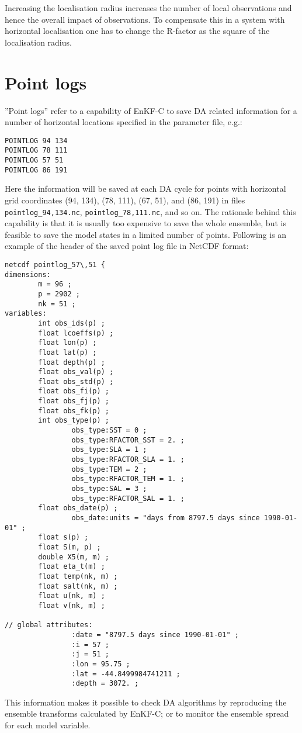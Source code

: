 \documentclass[11pt]{report}
\begin{document}
Increasing the localisation radius increases the number of local observations and hence the overall impact of observations.
To compensate this in a system with horizontal localisation one has to change the R-factor as the square of the localisation radius.

\section{Point logs}

''Point logs'' refer to a capability of EnKF-C to save DA related information for a number of horizontal locations specified in the parameter file, e.g.:
\begin{Verbatim}[frame=single,fontsize=\footnotesize]
POINTLOG 94 134
POINTLOG 78 111
POINTLOG 57 51
POINTLOG 86 191
\end{Verbatim}
Here the information will be saved at each DA cycle for points with horizontal grid coordinates (94, 134), (78, 111), (67, 51), and (86, 191) in files \verb|pointlog_94,134.nc|, \verb|pointlog_78,111.nc|, and so on.
The rationale behind this capability is that it is usually too expensive to save the whole ensemble, but is feasible to save the model states in a limited number of points.
Following is an example of the header of the saved point log file in NetCDF format:
\begin{Verbatim}[frame=single,fontsize=\footnotesize]
netcdf pointlog_57\,51 {
dimensions:
        m = 96 ;
        p = 2902 ;
        nk = 51 ;
variables:
        int obs_ids(p) ;
        float lcoeffs(p) ;
        float lon(p) ;
        float lat(p) ;
        float depth(p) ;
        float obs_val(p) ;
        float obs_std(p) ;
        float obs_fi(p) ;
        float obs_fj(p) ;
        float obs_fk(p) ;
        int obs_type(p) ;
                obs_type:SST = 0 ;
                obs_type:RFACTOR_SST = 2. ;
                obs_type:SLA = 1 ;
                obs_type:RFACTOR_SLA = 1. ;
                obs_type:TEM = 2 ;
                obs_type:RFACTOR_TEM = 1. ;
                obs_type:SAL = 3 ;
                obs_type:RFACTOR_SAL = 1. ;
        float obs_date(p) ;
                obs_date:units = "days from 8797.5 days since 1990-01-01" ;
        float s(p) ;
        float S(m, p) ;
        double X5(m, m) ;
        float eta_t(m) ;
        float temp(nk, m) ;
        float salt(nk, m) ;
        float u(nk, m) ;
        float v(nk, m) ;

// global attributes:
                :date = "8797.5 days since 1990-01-01" ;
                :i = 57 ;
                :j = 51 ;
                :lon = 95.75 ;
                :lat = -44.8499984741211 ;
                :depth = 3072. ;
\end{Verbatim}
This information makes it possible to check DA algorithms by reproducing the ensemble transforms calculated by EnKF-C; or to monitor the ensemble spread for each model variable.
\end{document}
